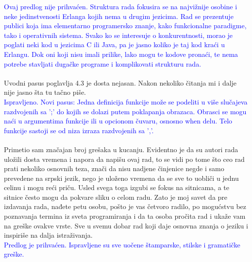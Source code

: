 \documentclass[a4paper]{report}
\newcommand{\odgovor}[1]{\textcolor{blue}{#1}}
\begin{document}
\odgovor{Ovaj predlog nije prihvaćen. Struktura rada fokusira se na 
najvižnije osobine i neke jedinstvenosti Erlanga kojih nema u drugim jezicima. Rad se prezentuje publici koja ima
elementarno programersko znanje, kako funkcionalne paradigme, tako i
operativnih sistema. Svako ko se interesuje o konkurentnosti, morao je
poglati neki kod u jezicima C ili Java, pa je jasno koliko je taj kod 
kraći u Erlangu. Dok oni koji nisu imali prilike, lako mogu te kodove
pronaći, te nema potrebe stavljati dugačke programe i komplikovati
strukturu rada.}

\paragraph{}
Uvodni pasus poglavlja 4.3 je dosta nejasan. Nakon nekoliko čitanja mi i dalje nije jasno šta tu tačno piše.\\

\odgovor{Ispravljeno. Novi pasus: Jedna definicija funkcije može se podeliti u više slučajeva
razdvojenih sa ';' do kojih se dolazi putem poklapanja obrazaca.
Obrasci se mogu naći u argumentima funkcije ili u opcionom čuvaru,
osnosno when delu. Telo funkcije sastoji se od niza izraza razdvojenih sa ','.}

\paragraph{} 
Primetio sam značajan broj grešaka u kucanju. Evidentno je da su autori rada uložili dosta vremena i napora da napišu ovaj rad, to se vidi po tome što ceo rad prati nekoliko osnovnih teza, znači da nisu nadjene činjenice negde i samo prevedene na srpski jezik, nego je uloženo vremena da se sve to uobliči u jednu celinu i mogu reći priču. Usled svega toga izgubi se fokus na sitnicama, a te sitnice često mogu da pokvare sliku o celom radu. Zato je moj savet da pre izdavanja rada, nađete petu osobu, pošto je vas četvoro radilo, po mogućstvu bez poznavanja termina iz sveta programiranja i da ta osoba pročita rad i ukaže vam na greške ovakve vrste.
Sve u svemu dobar rad koji daje osnovna znanja o jeziku i inspiriše na dalja istraživanja.\\

\odgovor{Predlog je prihvaćen. Ispravljene su sve uočene štamparske, stilske i gramatičke greške.}
\end{document}
